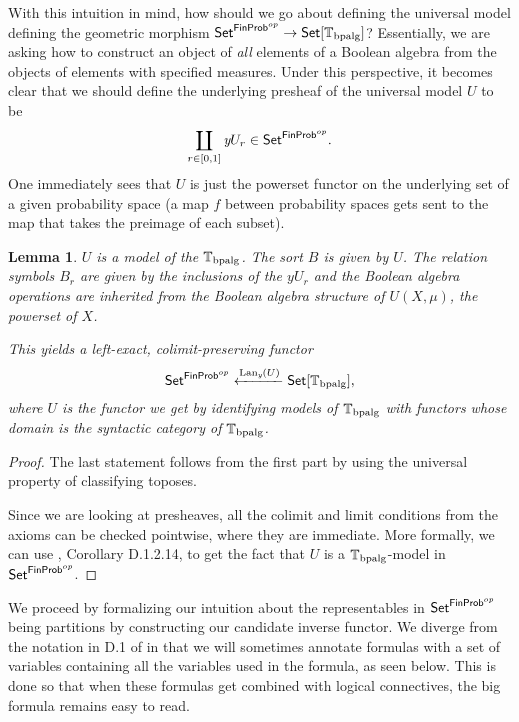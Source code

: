 \documentclass[a4paper]{amsproc}
\theoremstyle{plain}
\newtheorem{lemma}[theorem]{Lemma}
\theoremstyle{definition}
\theoremstyle{remark}
\numberwithin{equation}{section}
\newcommand{\y}{\textit{y}}
\DeclareMathOperator{\Lan}{Lan}
\newcommand{\Set}{\textup{\textsf{Set}}}
\newcommand{\FinProb}{\textup{\textsf{FinProb}}}
\begin{document}
With this intuition in mind, how should we go about defining the universal model defining the geometric morphism $\Set^{\FinProb^{op}} \to \Set[\mathbb{T}_{\textup{bpalg}}]$? Essentially, we are asking how to construct an object of \emph{all} elements of a Boolean algebra from the objects of elements with specified measures. Under this perspective, it becomes clear that we should define the underlying presheaf of the universal model $U$ to be
\[
\coprod_{r \in [0,1]} \y U_r \in \Set^{\FinProb^{op}} .
\]
One immediately sees that $U$ is just the powerset functor on the underlying set of a given probability space (a map $f$ between probability spaces gets sent to the map that takes the preimage of each subset).

\begin{lemma} \label{universal model}
$U$ is a model of the $\mathbb{T}_{\textup{bpalg}}$. The sort $B$ is given by $U$. The relation symbols $B_r$ are given by the inclusions of the $\y U_r$ and the Boolean algebra operations are inherited from the Boolean algebra structure of $U(X, \mu)$, the powerset of $X$.

This yields a left-exact, colimit-preserving functor
\[
    \Set^{\FinProb^{op}} \xleftarrow{\Lan_{\y}(U)} \Set[\mathbb{T}_{\textup{bpalg}}],
\]
where $U$ is the functor we get by identifying models of $\mathbb{T}_{\textup{bpalg}}$ with functors whose domain is the syntactic category of $\mathbb{T}_{\textup{bpalg}}$.
\end{lemma}
\begin{proof}
The last statement follows from the first part by using the universal property of classifying toposes.

Since we are looking at presheaves, all the colimit and limit conditions from the axioms can be checked pointwise, where they are immediate. More formally, we can use \cite{johnstone2002sketches2}, Corollary D.1.2.14, to get the fact that $U$ is a $\mathbb{T}_{\textup{bpalg}}$-model in $\Set^{\FinProb^{op}}$.
\end{proof}

We proceed by formalizing our intuition about the representables in $\Set^{\FinProb^{op}}$ being partitions by constructing our candidate inverse functor. We diverge from the notation in D.1 of \cite{johnstone2002sketches2} in that we will sometimes annotate formulas with a set of variables containing all the variables used in the formula, as seen below. This is done so that when these formulas get combined with logical connectives, the big formula remains easy to read.
\end{document}
